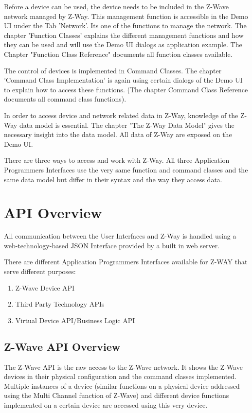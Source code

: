 Before a device can be used, the device needs to be included in the Z-Wave network managed by Z-Way.
This management function  is accessible in the Demo UI under the Tab 'Network'. Its one of the functions to manage the 
network. The chapter 'Function Classes' explains the different management functions and how they can be used and will
use the Demo UI dialogs as application example. The Chapter "Function Class Reference" documents all function
classes available.

The control of devices  is implemented in Command Classes. The chapter 'Command Class Implementation' is again using 
certain dialogs of the Demo UI to explain how to access these functions. (The chapter Command Class Reference 
documents all command class functions). 


In order to access device and network related data in Z-Way, knowledge of the Z-Way data model is essential.
The chapter "The Z-Way Data Model" gives the necessary insight into the data model. All data of Z-Way
are exposed on the Demo UI.

There are three ways to access and work with Z-Way. All three Application Programmers Interfaces use the very same
function and command classes and the same data model but differ in their syntax and the way they access data.



\section{API Overview}

All communication between the User Interfaces and Z-Way is handled using a 
web-technology-based  JSON Interface provided by a built in web server.

There are different Application Programmers Interfaces available for Z-WAY that serve 
different purposes:
\begin{enumerate}
\item Z-Wave Device API
\item Third Party Technology APIs
\item Virtual Device API/Business Logic API
\end{enumerate}

\subsection{Z-Wave API Overview}

The Z-Wave API is the raw access to the Z-Wave network. It shows the Z-Wave devices in 
their physical configuration and the command classes implemented.  Multiple instances of 
a device (similar functions on a physical device addressed using the Multi Channel 
function of Z-Wave) and different device functions implemented on a certain device are 
accessed using this very device.

